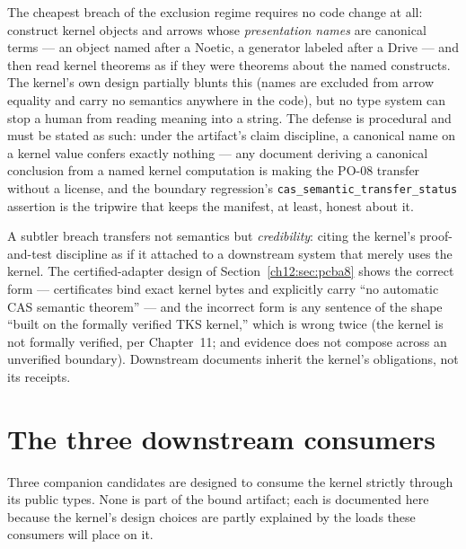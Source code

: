 \begin{threat}\label{ch12:thr:naming}
The cheapest breach of the exclusion regime requires no code change at
all: construct kernel objects and arrows whose \emph{presentation
names} are canonical terms --- an object named after a Noetic, a
generator labeled after a Drive --- and then read kernel theorems as
if they were theorems about the named constructs. The kernel's own
design partially blunts this (names are excluded from arrow equality
and carry no semantics anywhere in the code), but no type system can
stop a human from reading meaning into a string. The defense is
procedural and must be stated as such: under the artifact's claim
discipline, a canonical name on a kernel value confers exactly nothing
--- any document deriving a canonical conclusion from a named kernel
computation is making the PO-08 transfer without a license, and the
boundary regression's \texttt{cas\_semantic\_transfer\_status}
assertion is the tripwire that keeps the manifest, at least, honest
about it.
\end{threat}

\begin{threat}\label{ch12:thr:evidence}
A subtler breach transfers not semantics but \emph{credibility}: citing
the kernel's proof-and-test discipline as if it attached to a
downstream system that merely uses the kernel. The certified-adapter
design of Section~\ref{ch12:sec:pcba8} shows the correct form ---
certificates bind exact kernel bytes and explicitly carry ``no
automatic CAS semantic theorem'' --- and the incorrect form is any
sentence of the shape ``built on the formally verified TKS kernel,''
which is wrong twice (the kernel is not formally verified, per
Chapter~11; and evidence does not compose across an unverified
boundary). Downstream documents inherit the kernel's obligations, not
its receipts.
\end{threat}

\section{The three downstream consumers}\label{ch12:sec:downstream}

Three companion candidates are designed to consume the kernel strictly
through its public types. None is part of the bound artifact; each is
documented here because the kernel's design choices are partly
explained by the loads these consumers will place on it.

